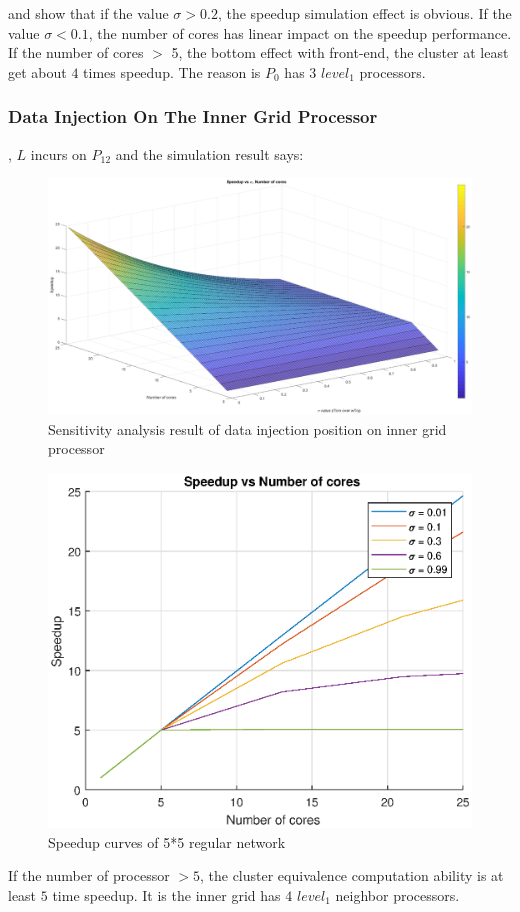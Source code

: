  and  show that if the value $\sigma > 0.2$, the speedup simulation effect is obvious.   If the value $\sigma < 0.1$, the number of cores has linear impact on the speedup performance.   If the number of cores $>$ 5, the bottom effect with front-end, the cluster at least get about $4$ times speedup.   The reason is $P_{0}$ has $3$ $level_{1}$ processors.  

\newpage

\subsubsection{Data Injection On The Inner Grid Processor}

, $L$ incurs on $P_{12}$ and the simulation result says:
\begin{figure}[!ht]
\centering
\includegraphics[width=1\columnwidth]{figure/sa5t5i.eps}
\caption{Sensitivity analysis result of data injection position on inner grid processor}
\label{fig:sa5t5i}
\end{figure}

\begin{figure}[!ht]
\centering
\includegraphics[width=1\columnwidth]{figure/sa5t5i_curve.eps}
\caption{Speedup curves of 5*5 regular network }
\label{fig:sa5t5i_curve}
\end{figure}

If the number of processor $ > 5$, the cluster equivalence computation ability is at least $5$ time speedup.  It is the inner grid has $4$ $level_{1}$ neighbor processors.  
\newpage
